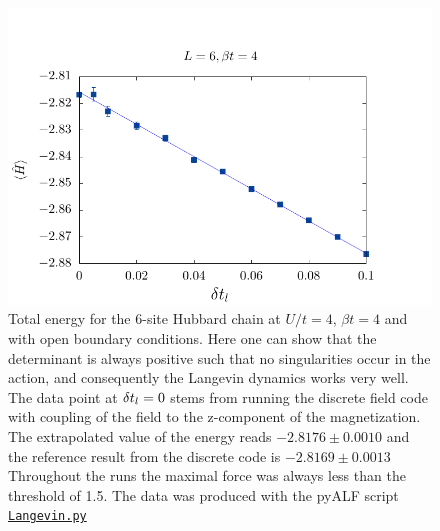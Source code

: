 \begin{figure}[H]
        \begin{center}
                \includegraphics[scale=0.9,clip]{Figures/Langevin.pdf}
            \end{center}
        \caption{Total energy for the 6-site Hubbard chain at $U/t=4$, $\beta t = 4$ and with open boundary conditions.   Here one can show that the determinant is always positive such that  no   singularities occur in the action, and consequently the Langevin dynamics works very well.  The data point at $\delta t_{l} =0$ stems from running the  discrete  field code with coupling  of the field to the z-component of the magnetization.  The extrapolated value of the energy reads
        $-2.8176   \pm 0.0010$       
        and the reference result from the discrete code is
        $-2.8169   \pm 0.0013$
         Throughout the runs the maximal force was always less than the threshold of 1.5.    The data was produced with the pyALF script 
         \href{??}{\texttt{Langevin.py}}   }\label{Langevin.fig}
\end{figure}

